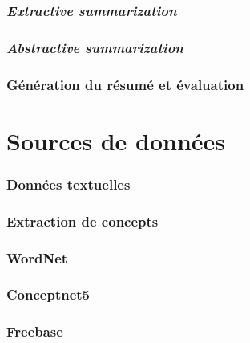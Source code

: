 \documentclass[12pt, handout]{beamer}
\begin{document}
\begin{frame}
 \frametitle{\textit{Extractive summarization}}
 
 
\end{frame}

\begin{frame}
 \frametitle{\textit{Abstractive summarization}}
 
 
\end{frame}


\begin{frame}
 \frametitle{Génération du résumé et évaluation}
 
 
\end{frame}


\section{Sources de données}


\begin{frame}
 \frametitle{Données textuelles}
 
 
\end{frame}


\begin{frame}
 \frametitle{Extraction de concepts}
 
 
\end{frame}

\begin{frame}
 \frametitle{WordNet}
 
 
\end{frame}

\begin{frame}
 \frametitle{Conceptnet5}
 
 
\end{frame}

\begin{frame}
 \frametitle{Freebase}
 
 
\end{frame}
\end{document}
